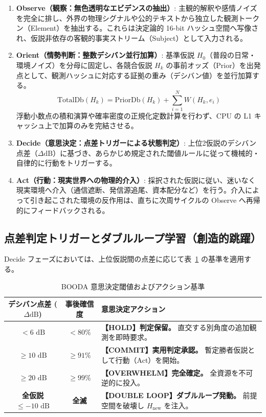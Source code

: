 \begin{enumerate}[label=\textbf{\arabic*.}]
  \item \textbf{Observe（観察：無色透明なエビデンスの抽出）}:
    主観的解釈や感情ノイズを完全に排し、外界の物理シグナルや公的テキストから独立した観測トークン（Element）を抽出する。これらは決定論的 16-bit ハッシュ空間へ写像され、仮説非依存の客観的事実ストリーム（Subject）として入力される。
  \item \textbf{Orient（情勢判断：整数デシバン並行加算）}:
    基準仮説 $H_0$（普段の日常・環境ノイズ）を分母に固定し、各競合仮説 $H_k$ の事前オッズ（Prior）を出発点として、観測ハッシュに対応する証拠の重み（デシバン値）を並行加算する。
    \begin{equation}
      \text{TotalDb}(H_k) = \text{PriorDb}(H_k) + \sum_{i=1}^{N} W(H_k, e_i)
      \label{eq:booda_orient_update}
    \end{equation}
    浮動小数点の積和演算や確率密度の正規化定数計算を行わず、CPU の L1 キャッシュ上で加算のみを完結させる。
  \item \textbf{Decide（意思決定：点差トリガーによる状態判定）}:
    上位2仮説のデシバン点差（$\Delta\text{dB}$）に基づき、あらかじめ規定された閾値ルールに従って機械的・自律的に行動をトリガーする。
  \item \textbf{Act（行動：現実世界への物理的介入）}:
    採択された仮説に従い、迷いなく現実環境へ介入（通信遮断、発信源追尾、資本配分など）を行う。介入によって引き起こされた環境の反作用は、直ちに次周サイクルの Observe へ再帰的にフィードバックされる。
\end{enumerate}

\subsection{点差判定トリガーとダブルループ学習（創造的跳躍）}

Decide フェーズにおいては、上位仮説間の点差に応じて表~\ref{tab:booda_decision_rules} の基準を適用する。

\begin{table}[htbp]
  \centering
  \small
  \caption{BOODA 意思決定閾値およびアクション基準}
  \label{tab:booda_decision_rules}
  \vspace{2mm}
  \begin{tabular}{ccl}
    \toprule
    デシバン点差 ($\Delta\text{dB}$) & 事後確信度 & 意思決定アクション \\
    \midrule
    $< 6\text{ dB}$                  & $< 80\%$   & \textbf{【HOLD】判定保留。} 直交する別角度の追加観測を即時要求。 \\
    $\ge 10\text{ dB}$               & $\ge 91\%$ & \textbf{【COMMIT】実用判定承認。} 暫定勝者仮説として行動（Act）を開始。 \\
    $\ge 20\text{ dB}$               & $\ge 99\%$ & \textbf{【OVERWHELM】完全確定。} 全資源を不可逆的に投入。 \\
    \midrule
    \textbf{全仮説 $\le -10\text{ dB}$} & \textbf{全滅} & \textbf{【DOUBLE LOOP】ダブルループ発動。} 前提空間を破壊し $H_{\text{new}}$ を注入。 \\
    \bottomrule
  \end{tabular}
\end{table}

